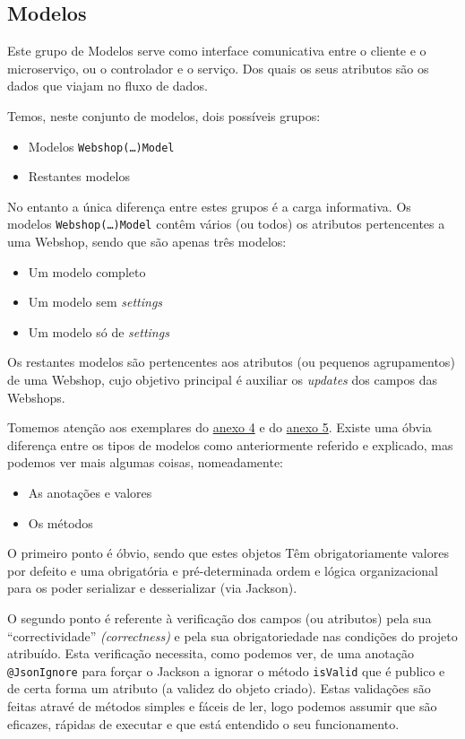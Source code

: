 \newpage

\subsection{Modelos}

Este grupo de Modelos serve como interface comunicativa entre o cliente e o microserviço, ou o controlador e o serviço. Dos quais os seus atributos são os dados que viajam no fluxo de dados.

Temos, neste conjunto de modelos, dois possíveis grupos:

\begin{itemize}
  \item {Modelos \texttt{Webshop(\ldots)Model}}
  \item {Restantes modelos}
\end{itemize}

No entanto a única diferença entre estes grupos é a carga informativa. Os modelos \texttt{Webshop(\dots)Model} contêm vários (ou todos) os atributos pertencentes a uma Webshop, sendo que são apenas três modelos:

\begin{itemize}
  \item Um modelo completo
  \item Um modelo sem \textit{settings}
  \item Um modelo só de \textit{settings}
\end{itemize}

Os restantes modelos são pertencentes aos atributos (ou pequenos agrupamentos) de uma Webshop, cujo objetivo principal é auxiliar os \textit{updates} dos campos das Webshops.

Tomemos atenção aos exemplares do \hyperref[an4]{anexo 4} e do \hyperref[an5]{anexo 5}. Existe uma óbvia diferença entre os tipos de modelos como anteriormente referido e explicado, mas podemos ver mais algumas coisas, nomeadamente:

\begin{itemize}
  \item As anotações e valores
  \item Os métodos
\end{itemize}

O primeiro ponto é óbvio, sendo que estes objetos Têm obrigatoriamente valores por defeito e uma obrigatória e pré-determinada ordem e lógica organizacional para os poder serializar e desserializar (via Jackson).

O segundo ponto é referente à verificação dos campos (ou atributos) pela sua ``correctividade'' \textit{(correctness)} e pela sua obrigatoriedade nas condições do projeto atribuído. Esta verificação necessita, como podemos ver, de uma anotação \texttt{@JsonIgnore} para forçar o Jackson a ignorar o método \texttt{isValid} que é publico e de certa forma um atributo (a validez do objeto criado). Estas validações são feitas atravé de métodos simples e fáceis de ler, logo podemos assumir que são eficazes, rápidas de executar e que está entendido o seu funcionamento.

